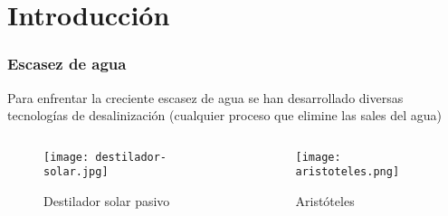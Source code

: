 \section{Introducción}

\begin{frame}
	\frametitle{Escasez de agua}
	Para enfrentar la creciente escasez de agua se han desarrollado diversas tecnologías de desalinización (cualquier proceso que elimine las sales del agua)\\[5mm]
	\begin{columns}
		\begin{column}{0.5\linewidth}
			\centering
			\begin{figure}
				\centering
				\texttt{[image: destilador-solar.jpg]}
				\caption{Destilador solar pasivo}
			\end{figure}
		\end{column}
		\begin{column}{0.5\linewidth}
			\centering
			\begin{figure}
				\centering
				\texttt{[image: aristoteles.png]}
				\caption{Aristóteles}
			\end{figure}
		\end{column}
	\end{columns}
\end{frame}

